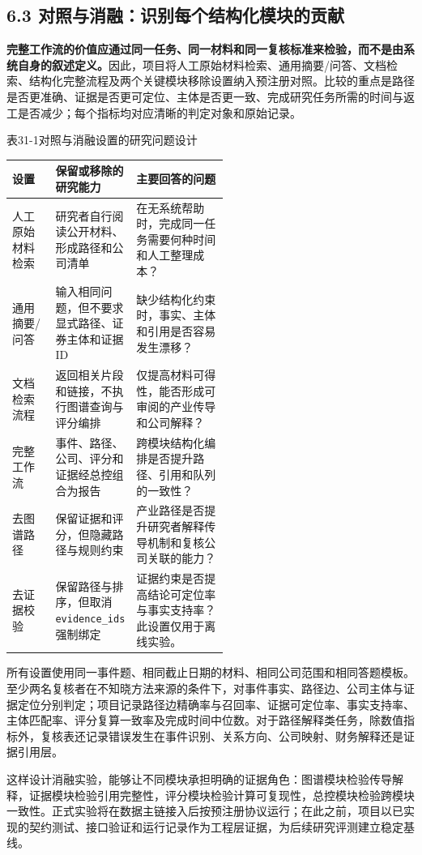 \subsection*{6.3 对照与消融：识别每个结构化模块的贡献}\label{page:31}
\noindent\textbf{完整工作流的价值应通过同一任务、同一材料和同一复核标准来检验，而不是由系统自身的叙述定义。}因此，项目将人工原始材料检索、通用摘要/问答、文档检索、结构化完整流程及两个关键模块移除设置纳入预注册对照。比较的重点是路径是否更准确、证据是否更可定位、主体是否更一致、完成研究任务所需的时间与返工是否减少；每个指标均对应清晰的判定对象和原始记录。

\begin{center}\small 表31-1\quad 对照与消融设置的研究问题设计\par\vspace{1mm}
\begin{tabularx}{\linewidth}{p{0.20\linewidth}p{0.33\linewidth}X}
\toprule
设置 & 保留或移除的研究能力 & 主要回答的问题\\
\midrule
人工原始材料检索 & 研究者自行阅读公开材料、形成路径和公司清单 & 在无系统帮助时，完成同一任务需要何种时间和人工整理成本？\\
通用摘要/问答 & 输入相同问题，但不要求显式路径、证券主体和证据ID & 缺少结构化约束时，事实、主体和引用是否容易发生漂移？\\
文档检索流程 & 返回相关片段和链接，不执行图谱查询与评分编排 & 仅提高材料可得性，能否形成可审阅的产业传导和公司解释？\\
完整工作流 & 事件、路径、公司、评分和证据经总控组合为报告 & 跨模块结构化编排是否提升路径、引用和队列的一致性？\\
去图谱路径 & 保留证据和评分，但隐藏路径与规则约束 & 产业路径是否提升研究者解释传导机制和复核公司关联的能力？\\
去证据校验 & 保留路径与排序，但取消\texttt{evidence\_ids}强制绑定 & 证据约束是否提高结论可定位率与事实支持率？此设置仅用于离线实验。\\
\bottomrule
\end{tabularx}\end{center}

所有设置使用同一事件题、相同截止日期的材料、相同公司范围和相同答题模板。至少两名复核者在不知晓方法来源的条件下，对事件事实、路径边、公司主体与证据定位分别判定；项目记录路径边精确率与召回率、证据可定位率、事实支持率、主体匹配率、评分复算一致率及完成时间中位数。对于路径解释类任务，除数值指标外，复核表还记录错误发生在事件识别、关系方向、公司映射、财务解释还是证据引用层。

这样设计消融实验，能够让不同模块承担明确的证据角色：图谱模块检验传导解释，证据模块检验引用完整性，评分模块检验计算可复现性，总控模块检验跨模块一致性。正式实验将在数据主链接入后按预注册协议运行；在此之前，项目以已实现的契约测试、接口验证和运行记录作为工程层证据，为后续研究评测建立稳定基线。
